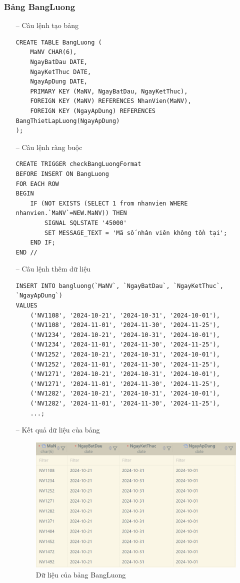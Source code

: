 \subsubsection{Bảng BangLuong}
\begin{itemize}
    \item [--] Câu lệnh tạo bảng
   \begin{verbatim}
CREATE TABLE BangLuong (
    MaNV CHAR(6),
    NgayBatDau DATE,
    NgayKetThuc DATE,
    NgayApDung DATE,
    PRIMARY KEY (MaNV, NgayBatDau, NgayKetThuc),
    FOREIGN KEY (MaNV) REFERENCES NhanVien(MaNV),
    FOREIGN KEY (NgayApDung) REFERENCES BangThietLapLuong(NgayApDung)
);
    \end{verbatim}
    \item [--] Câu lệnh ràng buộc
   \begin{verbatim}
CREATE TRIGGER checkBangLuongFormat 
BEFORE INSERT ON BangLuong
FOR EACH ROW
BEGIN
    IF (NOT EXISTS (SELECT 1 from nhanvien WHERE nhanvien.`MaNV`=NEW.MaNV)) THEN
        SIGNAL SQLSTATE '45000'
        SET MESSAGE_TEXT = 'Mã số nhân viên không tồn tại';
    END IF;
END //
    \end{verbatim}
    \newpage
    \item [--] Câu lệnh thêm dữ liệu
   \begin{verbatim}
INSERT INTO bangluong(`MaNV`, `NgayBatDau`, `NgayKetThuc`, `NgayApDung`) 
VALUES
    ('NV1108', '2024-10-21', '2024-10-31', '2024-10-01'),
    ('NV1108', '2024-11-01', '2024-11-30', '2024-11-25'),
    ('NV1234', '2024-10-21', '2024-10-31', '2024-10-01'),
    ('NV1234', '2024-11-01', '2024-11-30', '2024-11-25'),
    ('NV1252', '2024-10-21', '2024-10-31', '2024-10-01'),
    ('NV1252', '2024-11-01', '2024-11-30', '2024-11-25'),
    ('NV1271', '2024-10-21', '2024-10-31', '2024-10-01'),
    ('NV1271', '2024-11-01', '2024-11-30', '2024-11-25'),
    ('NV1282', '2024-10-21', '2024-10-31', '2024-10-01'),
    ('NV1282', '2024-11-01', '2024-11-30', '2024-11-25'),
    ...;
    \end{verbatim}
    \item [--] Kết quả dữ liệu của bảng
    \begin{figure}[H]
        \centering
        \includegraphics[width=1\linewidth]{content/images/data_bangluong.png}
        \caption{Dữ liệu của bảng BangLuong}
        \label{fig:data_bangluong}
    \end{figure}
\end{itemize}



\newpage